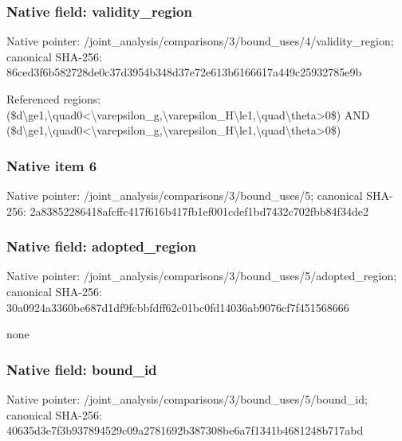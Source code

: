 \documentclass[10pt,a4paper]{article}
\begin{document}
\subsubsection{Native field: validity\_\allowbreak{}region}
Native pointer: /joint\_\allowbreak{}analysis/comparisons/3/bound\_\allowbreak{}uses/4/validity\_\allowbreak{}region; canonical SHA-256: 86ced3f6b582728de0c37d3954b348d37e72e613b6166617a449c25932785e9b

\begingroup\raggedright\sloppy Referenced regions:\allowbreak{} (\$d\textbackslash{}ge1,\allowbreak{}\textbackslash{}quad0<\textbackslash{}varepsilon\_\allowbreak{}g,\allowbreak{}\textbackslash{}varepsilon\_\allowbreak{}H\textbackslash{}le1,\allowbreak{}\textbackslash{}quad\textbackslash{}theta>0\$) AND (\$d\textbackslash{}ge1,\allowbreak{}\textbackslash{}quad0<\textbackslash{}varepsilon\_\allowbreak{}g,\allowbreak{}\textbackslash{}varepsilon\_\allowbreak{}H\textbackslash{}le1,\allowbreak{}\textbackslash{}quad\textbackslash{}theta>0\$)\par\endgroup

\subsubsection{Native item 6}
Native pointer: /joint\_\allowbreak{}analysis/comparisons/3/bound\_\allowbreak{}uses/5; canonical SHA-256: 2a83852286418afcffc417f616b417fb1ef001cdef1bd7432c702fbb84f34de2

\subsubsection{Native field: adopted\_\allowbreak{}region}
Native pointer: /joint\_\allowbreak{}analysis/comparisons/3/bound\_\allowbreak{}uses/5/adopted\_\allowbreak{}region; canonical SHA-256: 30a0924a3360be687d1df9fcbbfdff62c01bc0fd14036ab9076cf7f451568666

\begingroup\raggedright\sloppy none\par\endgroup

\subsubsection{Native field: bound\_\allowbreak{}id}
Native pointer: /joint\_\allowbreak{}analysis/comparisons/3/bound\_\allowbreak{}uses/5/bound\_\allowbreak{}id; canonical SHA-256: 40635d3e7f3b937894529c09a2781692b387308be6a7f1341b4681248b717abd
\end{document}
